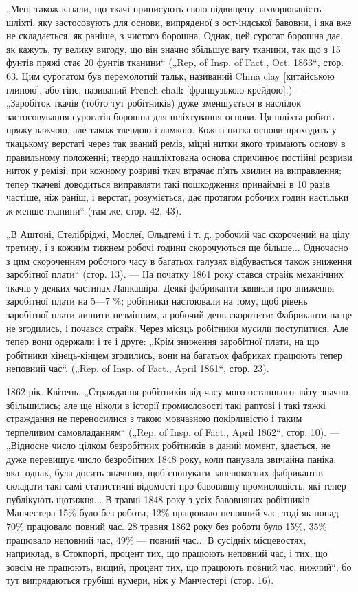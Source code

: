 „Мені також казали, що ткачі приписують свою підвищену
захворюваність шліхті, яку застосовують для основи, випряденої
з ост-індської бавовни, і яка вже не складається, як раніше,
з чистого борошна. Однак, цей сурогат борошна дає, як кажуть,
ту велику вигоду, що він значно збільшує вагу тканини, так
що з 15 фунтів пряжі стає 20 фунтів тканини“ („Rep, of Insp.
of Fact., Oct. 1863“, стор. 63. Цим сурогатом був перемолотий
тальк, називаний China clay [китайською глиною], або гіпс, називаний
French chalk [французькою крейдою].) — „Заробіток ткачів
(тобто тут робітників) дуже зменшується в наслідок застосовування
сурогатів борошна для шліхтування основи. Ця шліхта
робить пряжу важчою, але також твердою і ламкою. Кожна
нитка основи проходить у ткацькому верстаті через так званий
реміз, міцні нитки якого тримають основу в правильному положенні;
твердо нашліхтована основа спричинює постійні розриви
ниток у ремізі; при кожному розриві ткач втрачає п’ять хвилин
на виправлення; тепер ткачеві доводиться виправляти такі
пошкодження принаймні в 10 разів частіше, ніж раніш, і верстат,
розуміється, дає протягом робочих годин настільки ж менше
тканини“ (там же, стор. 42, 43).

„В Аштоні, Стелібріджі, Мослеї, Ольдгемі і т. д. робочий
час скорочений на цілу третину, і з кожним тижнем робочі години
скорочуються ще більше... Одночасно з цим скороченням
робочого часу в багатьох галузях відбувається також зниження
заробітної плати“ (стор. 13). — На початку 1861 року стався
страйк механічних ткачів у деяких частинах Ланкашіра. Деякі
фабриканти заявили про зниження заробітної плати на 5—7 \%;
робітники настоювали на тому, щоб рівень заробітної плати лишити
незмінним, а робочий день скоротити: Фабриканти на це не
згодились, і почався страйк. Через місяць робітники мусили поступитися.
Але тепер вони одержали і те і друге: „Крім зниження
заробітної плати, на що робітники кінець-кінцем згодились,
вони на багатьох фабриках працюють тепер неповний час“.
(„Rep. of Insp. of Fact., April 1861“, стор. 23).

1862 рік. Квітень. „Страждання робітників від часу мого
останнього звіту значно збільшились; але ще ніколи в історії
промисловості такі раптові і такі тяжкі страждання не переносилися
з такою мовчазною покірливістю і таким терпеливим
самовладанням“ („Rep. of Insp. of Fact., April 1862“, стор. 10). —
„Відносне число цілком безробітних робітників в даний момент,
здається, не дуже перевищує число безробітних 1848 року,
коли панувала звичайна паніка, яка, однак, була досить значною,
щоб спонукати занепокоєних фабрикантів складати такі
самі статистичні відомості про бавовняну промисловість, які
тепер публікують щотижня... В травні 1848 року з усіх бавовняних
робітників Манчестера 15\% було без роботи, 12\% працювало
неповний час, тоді як понад 70\% працювало повний час. 28 травня
1862 року без роботи було 15\%, 35\% працювало неповний час,
49\% — повний час... В сусідніх місцевостях, наприклад, в Стокпорті,
процент тих, що працюють неповний час, і тих, що зовсім
не працюють, вищий, процент тих, що працюють повний час,
нижчий“, бо тут випрядаються грубіші нумери, ніж у Манчестері
(стор. 16).

